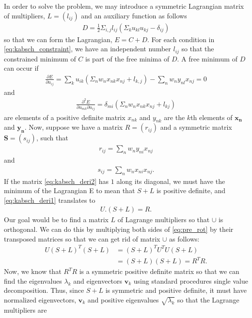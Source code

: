  In order to solve the problem, we may introduce a symmetric Lagrangian matrix of multipliers, $L = (l_{ij})$ and an auxiliary function as follows
 \begin{align}
 	D = \frac{1}{2} \Sigma_{i,j} l_{ij} \left(\Sigma_k u_{kl} u_{kj} - \delta_{ij}\right)
 \end{align}
 so that we can form the Lagrangian, $E= C+D$. For each condition in \autoref{eq:kabsch_constraint}, we have an independent number $l_{ij}$ so that the constrained minimum of $C$ is part of the free minima of $D$. A free minimum of $D$ can occur if
 \begin{align}
 	\frac{\partial E}{\partial u_{ij}} = \sum_k u_{ik} \left(\Sigma_n w_n x_{nk}x_{nj} + l_{k,j}\right) - \sum_n w_n y_{nl} x_{nj} = 0
 	\label{eq:kabsch_deri1}
 \end{align}
 and 
 \begin{align}
 	\frac{\partial^2 E}{\partial u_{mk} \partial u_{ij}} = \delta_{mi} \left(\Sigma_n w_n x_{nk} x_{nj} + l_{kj}\right)
 	\label{eq:kabsch_deri2}
 \end{align}
 are elements of a positive definite matrix $x_{nk}$ and $y_{nk}$ are the $k$th elements of $\bm{x_n}$ and $\bm{y_n}$. Now, suppose we have a matrix $R=(r_{ij})$ and a symmetric matrix $\bm{S} = \left(s_{ij}\right)$, such that
 \begin{align}
 	r_{ij} = \sum_n w_n y_{ni} x_{nj}
 \end{align}
 and
 \begin{align}
 	s_{ij} = \sum_n w_n x_{ni} x_{nj}.
 \end{align}
 If the matrix \eqref{eq:kabsch_deri2} has $1$ along its diagonal, we must have the minimum of the Lagrangian E to mean that $S+L$ is positive definite, and \eqref{eq:kabsch_deri1} translates to 
 \begin{align}
 U . \left(S+L\right) = R.
 \label{eq:pre_rot}
 \end{align}
 Our goal would be to find a matrix $L$ of Lagrange multipliers so that $\cup$ is orthogonal. We can do this by multiplying both sides of \eqref{eq:pre_rot} by their transposed matrices so that we can get rid of matrix $\cup$ as follows:
 \begin{align}
 	U {(S+L)}^T(S+L) &= {(S+L)}^T{U}^TU(S+L) \nonumber \\
 	&= (S+L)(S+L) = {R}^TR.
 \end{align}
 Now, we know that ${R}^TR$ is a symmetric positive definite matrix so that we can find the eigenvalues $\lambda_k$ and eigenvectors $\bm{v}_k$ using standard procedures \eg single value decomposition. Thus, since $S+L$ is symmetric and positive definite, it must have normalized eigenvectors, $\bm{v}_k$ and positive eigenvalues $\sqrt{\lambda_k}$  so that the Lagrange multipliers are
